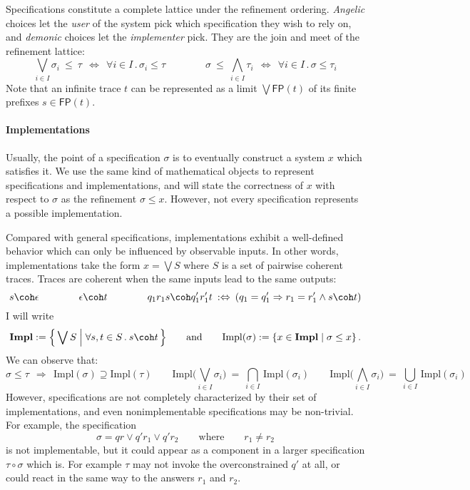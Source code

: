 \documentclass[11pt]{article}
\begin{document}
Specifications constitute a complete lattice under the refinement ordering.
\emph{Angelic} choices let the \emph{user} of the system
pick which specification they wish to rely on,
and \emph{demonic} choices let the \emph{implementer} pick.
They are the join and meet of the refinement lattice:
\[
  \bigvee_{i \in I} \sigma_i \:\le\: \tau
  \:\:\Leftrightarrow\:\:
  \forall i \in I \mathbin. \sigma_i \le \tau
  \qquad \qquad
  \sigma \:\le\: \bigwedge_{i \in I} \tau_i
  \:\:\Leftrightarrow\:\:
  \forall i \in I \mathbin. \sigma \le \tau_i
\]
Note that
an infinite trace $t$ can be represented as
a limit $\bigvee \mathsf{FP}(t)$ of its finite prefixes
$s \in \mathsf{FP}(t)$.

\paragraph{Implementations}

Usually,
the point of a specification $\sigma$ is to
eventually construct a system $x$ which satisfies it.
We use the same kind of mathematical objects
to represent specifications and implementations,
and will state the correctness of $x$ with respect to $\sigma$
as the refinement $\sigma \le x$.
However,
not every specification represents a possible implementation.

Compared with general specifications,
implementations exhibit a well-defined behavior
which can only be influenced by observable inputs.
In other words,
implementations take the form
$x = \bigvee S$
where $S$ is a set of pairwise coherent traces.
Traces are coherent when
the same inputs lead to the same outputs:
\[
  s \coh \epsilon \qquad\qquad
  \epsilon \coh t \qquad\qquad
  q_1 r_1 s \coh q_1' r_1' t
  \: :\Leftrightarrow \:
  (q_1 = q_1' \Rightarrow r_1 = r_1' \wedge s \coh t)
\]
I will write
\[
  \mathbf{Impl} := \Big\{ \bigvee S \mathrel\Big|
    \forall s, t \in S \mathbin. s \coh t  \, \Big\}
  \qquad \text{and} \qquad
  \mathrm{Impl}(\sigma) :=
    \{ x \in \mathbf{Impl} \mid \sigma \le x \}
  \,.
\]
We can observe that:
{\small \[
  \sigma \le \tau
  \:\:\Longrightarrow\:\:
  \mathrm{Impl}(\sigma) \supseteq
  \mathrm{Impl}(\tau)
\qquad
  \mathrm{Impl} \Big( \bigvee_{i \in I} \sigma_i \Big) \: = \:
  \bigcap_{i \in I} \, \mathrm{Impl}(\sigma_i)
\qquad
  \mathrm{Impl} \Big( \bigwedge_{i \in I} \sigma_i \Big) \: = \:
  \bigcup_{i \in I} \, \mathrm{Impl}(\sigma_i)
\]}%
However,
specifications are not completely characterized
by their set of implementations,
and even nonimplementable specifications
may be non-trivial.
For example, the specification
\[
  \sigma = q r \vee q' r_1 \vee q' r_2
  \qquad \text{where} \qquad
  r_1 \neq r_2
\]
is not implementable,
but it could appear as a component in a larger specification
$\tau \circ \sigma$ which is.
For example $\tau$ may not invoke the overconstrained $q'$ at all,
or could react in the same way to the answers $r_1$ and $r_2$.
\end{document}
